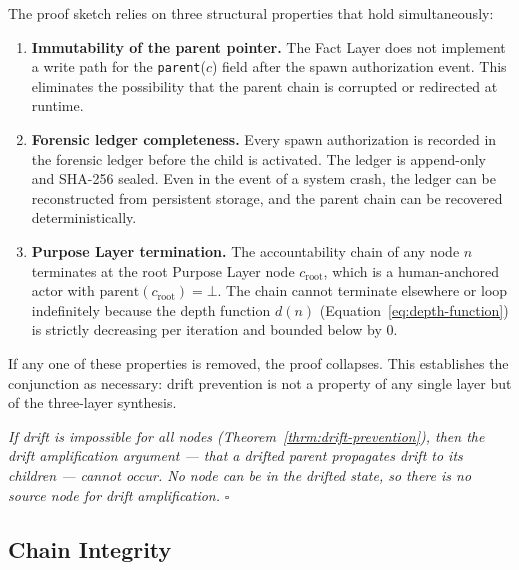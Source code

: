 The proof sketch relies on three structural properties that hold simultaneously:

\begin{enumerate}

\item \textbf{Immutability of the parent pointer.} The Fact Layer does not implement a write path for the \texttt{parent}($c$) field after the spawn authorization event. This eliminates the possibility that the parent chain is corrupted or redirected at runtime.

\item \textbf{Forensic ledger completeness.} Every spawn authorization is recorded in the forensic ledger before the child is activated. The ledger is append-only and SHA-256 sealed. Even in the event of a system crash, the ledger can be reconstructed from persistent storage, and the parent chain can be recovered deterministically.

\item \textbf{Purpose Layer termination.} The accountability chain of any node $n$ terminates at the root Purpose Layer node $c_{\text{root}}$, which is a human-anchored actor with $\text{parent}(c_{\text{root}}) = \bot$. The chain cannot terminate elsewhere or loop indefinitely because the depth function $d(n)$ (Equation~\ref{eq:depth-function}) is strictly decreasing per iteration and bounded below by $0$.

\end{enumerate}

If any one of these properties is removed, the proof collapses. This establishes the conjunction as necessary: drift prevention is not a property of any single layer but of the three-layer synthesis.

\begin{corol}
\textit{If drift is impossible for all nodes (Theorem~\ref{thrm:drift-prevention}), then the drift amplification argument — that a drifted parent propagates drift to its children — cannot occur. No node can be in the drifted state, so there is no source node for drift amplification.} $\square$
\end{corol}


\subsection{Chain Integrity}
\label{sec:chain-integrity}

